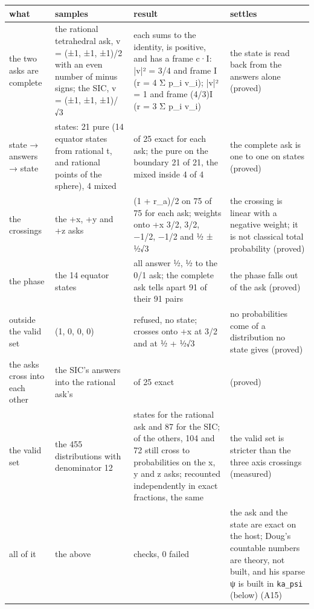 {\footnotesize
\setlength{\tabcolsep}{6pt}
\begin{longtable}{>{\RaggedRight\arraybackslash}p{}>{\RaggedRight\arraybackslash}p{}>{\RaggedRight\arraybackslash}p{}>{\RaggedRight\arraybackslash}p{}}
\toprule
what & samples & result & settles \\
\midrule
\endhead
the two asks are complete & the rational tetrahedral ask, v = (±1, ±1, ±1)/2 with an even number of minus signs; the SIC, v = (±1, ±1, ±1)/√3 & each sums to the identity, is positive, and has a frame c·I: |v|² = 3/4 and frame I (r = 4 Σ p\_\allowbreak{}i v\_\allowbreak{}i); |v|² = 1 and frame (4/3)I (r = 3 Σ p\_\allowbreak{}i v\_\allowbreak{}i) & the state is read back from the answers alone (proved) \\
state → answers → state & 25 states: 21 pure (14 equator states from rational t, and rational points of the sphere), 4 mixed & 25 of 25 exact for each ask; the pure on the boundary 21 of 21, the mixed inside 4 of 4 & the complete ask is one to one on states (proved) \\
the crossings & the +x, +y and +z asks & (1 + r\_\allowbreak{}a)/2 on 75 of 75 for each ask; weights onto +x 3/2, 3/2, −1/2, −1/2 and ½ ± ½√3 & the crossing is linear with a negative weight; it is not classical total probability (proved) \\
the phase & the 14 equator states & all answer ½, ½ to the 0/1 ask; the complete ask tells apart 91 of their 91 pairs & the phase falls out of the ask (proved) \\
outside the valid set & (1, 0, 0, 0) & refused, no state; crosses onto +x at 3/2 and at ½ + ½√3 & no probabilities come of a distribution no state gives (proved) \\
the asks cross into each other & the SIC's answers into the rational ask's & 25 of 25 exact & (proved) \\
the valid set & the 455 distributions with denominator 12 & 55 states for the rational ask and 87 for the SIC; of the others, 104 and 72 still cross to probabilities on the x, y and z asks; recounted independently in exact fractions, the same & the valid set is stricter than the three axis crossings (measured) \\
all of it & the above & 33 checks, 0 failed & the ask and the state are exact on the host; Doug's countable numbers are theory, not built, and his sparse ψ is built in \texttt{ka\_\allowbreak{}psi} (below) (A15) \\
\bottomrule
\end{longtable}
}

